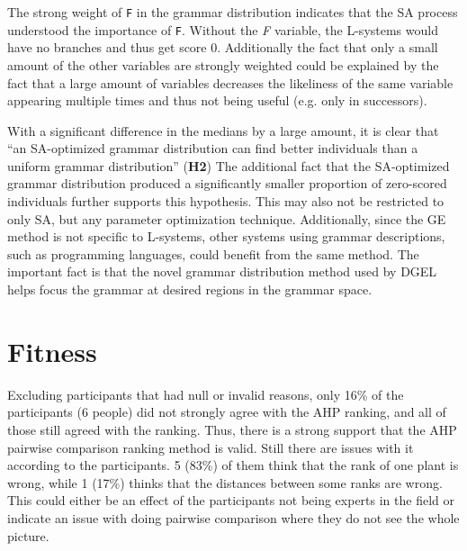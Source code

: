 The strong weight of \texttt{F} in the grammar distribution indicates that the SA process understood the importance of \texttt{F}.
Without the \textit{F} variable, the L-systems would have no branches and thus get score 0.
Additionally the fact that only a small amount of the other variables are strongly weighted could be explained by the fact that a large amount of variables decreases the likeliness of the same variable appearing multiple times and thus not being useful (e.g. only in successors).

With a significant difference in the medians by a large amount, it is clear that ``an SA-optimized grammar distribution can find better individuals than a uniform grammar distribution'' (\textbf{H2})
The additional fact that the SA-optimized grammar distribution produced a significantly smaller proportion of zero-scored individuals further supports this hypothesis.
This may also not be restricted to only SA, but any parameter optimization technique.
Additionally, since the GE method is not specific to L-systems, other systems using grammar descriptions, such as programming languages, could benefit from the same method.
The important fact is that the novel grammar distribution method used by DGEL helps focus the grammar at desired regions in the grammar space.


\section{Fitness}
Excluding participants that had null or invalid reasons, only 16\% of the participants (6 people) did not strongly agree with the AHP ranking, and all of those still agreed with the ranking.
Thus, there is a strong support that the AHP pairwise comparison ranking method is valid.
Still there are issues with it according to the participants.
5 (83\%) of them think that the rank of one plant is wrong, while 1 (17\%) thinks that the distances between some ranks are wrong.
This could either be an effect of the participants not being experts in the field or indicate an issue with doing pairwise comparison where they do not see the whole picture.

